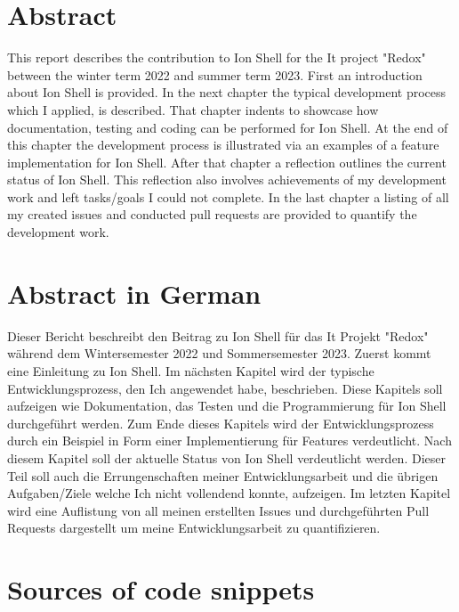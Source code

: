 \thispagestyle{empty}

\section{Abstract}

This report describes the contribution to Ion Shell for the It project "Redox"
between the winter term 2022 and summer term 2023.
First an introduction about Ion Shell is provided.
In the next chapter the typical development process which I applied, is described.
That chapter indents to showcase how documentation, testing and coding can be performed for Ion Shell.
At the end of this chapter the development process is illustrated via an examples of a feature implementation for Ion Shell.
After that chapter a reflection outlines the current status of Ion Shell.
This reflection also involves achievements of my development work and left tasks/goals I could not complete.
In the last chapter a listing of all my created issues and conducted pull requests are provided to quantify the development work.

\section{Abstract in German}

Dieser Bericht beschreibt den Beitrag zu Ion Shell für das It Projekt "Redox"
während dem Wintersemester 2022 und Sommersemester 2023.
Zuerst kommt eine Einleitung zu Ion Shell.
Im nächsten Kapitel wird der typische Entwicklungsprozess, den Ich angewendet habe, beschrieben.
Diese Kapitels soll aufzeigen wie Dokumentation, das Testen und die Programmierung für Ion Shell durchgeführt werden.
Zum Ende dieses Kapitels wird der Entwicklungsprozess durch ein Beispiel in Form einer Implementierung für Features verdeutlicht.
Nach diesem Kapitel soll der aktuelle Status von Ion Shell verdeutlicht werden.
Dieser Teil soll auch die Errungenschaften meiner Entwicklungsarbeit und die übrigen Aufgaben/Ziele welche Ich nicht vollendend konnte, aufzeigen.
Im letzten Kapitel wird eine Auflistung von all meinen erstellten Issues und durchgeführten Pull Requests dargestellt um
meine Entwicklungsarbeit zu quantifizieren.

\clearpage

\section{Sources of code snippets}

